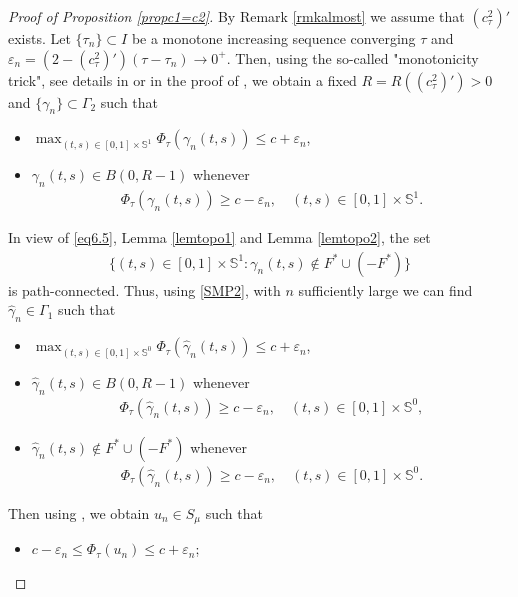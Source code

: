 \documentclass[10pt,a4paper]{article}
\theoremstyle{definition} \theoremstyle{remark}
\numberwithin{equation}{section}
\newcommand{\s}{\mathbb{S}}
\newcommand{\Ga}{\Gamma}
\newcommand{\ga}{\gamma}
\begin{document}
\begin{proof}[Proof of Proposition \ref{propc1=c2}]
	By Remark \ref{rmkalmost} we assume that $(c_\tau^2)'$ exists. Let $\{\tau_n\}\subset I$ be a monotone increasing sequence converging $\tau$ and $\varepsilon_n = (2-(c_\tau^2)')(\tau - \tau_n) \to 0^+$. Then, using the so-called "monotonicity trick", see details in \cite{Louis} or in the proof of \cite[Theorem 1.10]{BCJN}, we obtain a fixed $R = R((c_\tau^2)') > 0$ and $\{\gamma_n\} \subset \Gamma_2$ such that
	\begin{itemize}
		\item[(i)] $\displaystyle\max_{(t,s)\in [0,1]\times\s^1}\Phi_\tau(\gamma_n(t,s)) \leq c + \varepsilon_n$,
		\item[(ii)] $\gamma_n(t,s) \in B(0,R-1)$ whenever
		\begin{align*}
			\Phi_\tau(\gamma_n(t,s)) \geq c - \varepsilon_n, \quad (t,s) \in [0,1] \times \s^{1}.
		\end{align*}
	\end{itemize}
    In view of \eqref{eq6.5}, Lemma \ref{lemtopo1} and Lemma \ref{lemtopo2}, the set
    \begin{align*}
    	\bigl\{(t,s) \in [0,1]\times\s^1: \ga_n(t,s) \notin F^* \cup (-F^*)\bigr\}
    \end{align*}
     is path-connected. Thus, using \eqref{SMP2}, with $n$ sufficiently large we can find $\hat \gamma_n \in \Ga_1$ such that
     \begin{itemize}
     	\item[(a)] $\displaystyle\max_{(t,s)\in [0,1]\times\s^0}\Phi_\tau(\hat\gamma_n(t,s)) \leq c + \varepsilon_n$,
     	\item[(b)] $\hat\gamma_n(t,s) \in B(0,R-1)$ whenever
     	\begin{align*}
     		\Phi_\tau(\hat\gamma_n(t,s)) \geq c - \varepsilon_n, \quad (t,s) \in [0,1] \times \s^{0},
     	\end{align*}
        \item[(c)] $\hat \ga_n(t,s) \notin F^* \cup (-F^*)$ whenever
        \begin{align*}
        	\Phi_\tau(\hat\gamma_n(t,s)) \geq c - \varepsilon_n, \quad (t,s) \in [0,1] \times \s^{0}.
        \end{align*}
     \end{itemize}
     Then using \cite[Theorem 4.2]{BCJN}, we obtain $u_{n} \in S_\mu$ such that
     \begin{itemize}
     	\item[(1)]  $c - \varepsilon_n \le \Phi_\tau(u_{n}) \le c + \varepsilon_n$;

\end{itemize}
\end{proof}
\end{document}
